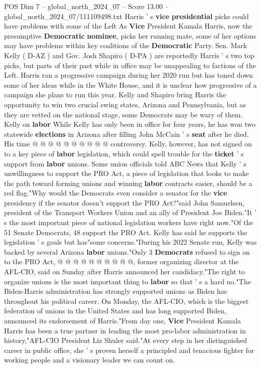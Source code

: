 \begin{textsample}{POS Dim 7 – global\_north\_2024\_07 – Score 13.00 – global\_north\_2024\_07/111109498.txt}  \label{ex:f7_pos_043}
Harris ' s \textbf{vice} \textbf{presidential} picks could have problems with some of the Left As \textbf{Vice} President Kamala Harris, now the presumptive \textbf{Democratic} \textbf{nominee}, picks her running mate, some of her options may have problems within key coalitions of the \textbf{Democratic} Party.
Sen.
Mark Kelly ( D-AZ ) and Gov.
Josh Shapiro ( D-PA ) are reportedly Harris ' s two top picks, but parts of their past while in office may be unappealing to factions of the Left.
Harris ran a progressive campaign during her 2020 run but has toned down some of her ideas while in the White House, and it is unclear how progressive of a campaign she plans to run this year.
Kelly and Shapiro bring Harris the opportunity to win two crucial swing states, Arizona and Pennsylvania, but as they are vetted on the national stage, some Democrats may be wary of them.
Kelly on \textbf{labor} While Kelly has only been in office for four years, he has won two statewide \textbf{elections} in Arizona after filling John McCain ' s \textbf{seat} after he died.
His time @ @ @ @ @ @ @ @ @ @ controversy.
Kelly, however, has not signed on to a key piece of \textbf{labor} legislation, which could spell trouble for the \textbf{ticket} ' s support from \textbf{labor} unions.
Some union officials told ABC News that Kelly ' s unwillingness to support the PRO Act, a piece of legislation that looks to make the path toward forming unions and winning \textbf{labor} contracts easier, should be a red flag."Why would the Democrats even consider a senator for the \textbf{vice} presidency if the senator doesn't support the PRO Act?"said John Samuelsen, president of the Transport Workers Union and an ally of President Joe Biden."It ' s the most important piece of national legislation workers have right now."Of the 51 Senate Democrats, 48 support the PRO Act.
Kelly has said he supports the legislation ' s goals but has"some concerns."During his 2022 Senate run, Kelly was backed by several Arizona \textbf{labor} unions."Only 3 \textbf{Democrats} refused to sign on to the PRO Act, @ @ @ @ @ @ @ @ @ @, former organizing director at the AFL-CIO, said on Sunday after Harris announced her candidacy."The right to organize unions is the most important thing to \textbf{labor} so that ' s a hard no."The Biden-Harris administration has strongly supported unions as Biden has throughout his political career.
On Monday, the AFL-CIO, which is the biggest federation of unions in the United States and has long supported Biden, announced its endorsement of Harris."From day one, \textbf{Vice} President Kamala Harris has been a true partner in leading the most pro-labor administration in history,"AFL-CIO President Liz Shuler said."At every step in her distinguished career in public office, she ' s proven herself a principled and tenacious fighter for working people and a visionary leader we can count on.

\end{textsample}
